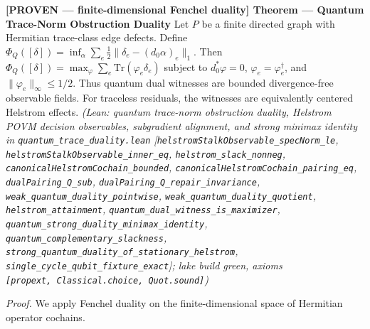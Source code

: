 \documentclass[
  11pt,
]{article}
\renewenvironment{quote}
  {\begin{leftbar}\small}
  {\end{leftbar}}
\begin{document}
\begin{quote}
\textbf{{[}PROVEN --- finite-dimensional Fenchel duality{]} Theorem --- Quantum Trace-Norm Obstruction Duality}
Let \(P\) be a finite directed graph with Hermitian trace-class edge defects. Define \(\Phi_Q([\delta]) = \inf_\alpha \sum_e \frac{1}{2} \|\delta_e - (d_0\alpha)_e\|_1\).
Then \(\Phi_Q([\delta]) = \max_\varphi \sum_e \text{Tr}(\varphi_e \delta_e)\) subject to \(d_0^*\varphi = 0\), \(\varphi_e = \varphi_e^\dagger\), and \(\|\varphi_e\|_\infty \le 1/2\). Thus quantum dual witnesses are bounded divergence-free observable fields. For traceless residuals, the witnesses are equivalently centered Helstrom effects.
\emph{(Lean: quantum trace-norm obstruction duality, Helstrom POVM decision observables, subgradient alignment, and strong minimax identity in \texttt{quantum\_trace\_duality.lean} {[}\texttt{helstromStalkObservable\_specNorm\_le}, \texttt{helstromStalkObservable\_inner\_eq}, \texttt{helstrom\_slack\_nonneg}, \texttt{canonicalHelstromCochain\_bounded}, \texttt{canonicalHelstromCochain\_pairing\_eq}, \texttt{dualPairing\_Q\_sub}, \texttt{dualPairing\_Q\_repair\_invariance}, \texttt{weak\_quantum\_duality\_pointwise}, \texttt{weak\_quantum\_duality\_quotient}, \texttt{helstrom\_attainment}, \texttt{quantum\_dual\_witness\_is\_maximizer}, \texttt{quantum\_strong\_duality\_minimax\_identity}, \texttt{quantum\_complementary\_slackness}, \texttt{strong\_quantum\_duality\_of\_stationary\_helstrom}, \texttt{single\_cycle\_qubit\_fixture\_exact}{]}; lake build green, axioms \texttt{{[}propext,\ Classical.choice,\ Quot.sound{]}})}

\emph{Proof.} We apply Fenchel duality on the finite-dimensional space of Hermitian operator cochains.


\end{quote}
\end{document}
